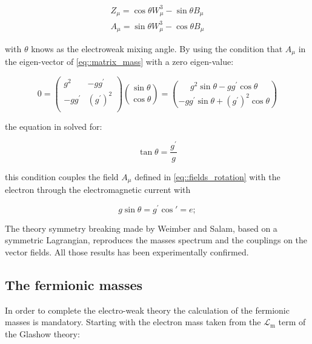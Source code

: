 \begin{equation}
\begin{array}{c}
Z_{\mu} = \cos\theta W^{3}_{\mu} -\sin\theta B_{\mu}\\
A_{\mu} =\sin\theta W^{3}_{\mu} - \cos\theta B_{\mu}

\end{array}
\label{eq::fields_rotation}
\end{equation}

with $\theta$ knows as the electroweak mixing angle. By using the condition that $A_{\mu}$ in the eigen-vector of \autoref{eq::matrix_mass} with a zero eigen-value:

\begin{equation}
0 = 
\begin{pmatrix}
g^{2} & -gg^{\prime} \\
-gg^{\prime} & (g^{\prime})^{2} \\
\end{pmatrix}
\binom{\sin\theta}{\cos\theta}
=
\binom{g^{2}\sin\theta - gg^{\prime}\cos\theta}{-gg^{\prime}\sin\theta + (g^{\prime})^{2}\cos\theta}
\label{eq::matrix_rotation}
\end{equation}

the equation in solved for:

\begin{equation}
\tan\theta = \dfrac{g^{\prime}}{g}
\label{eq::matrix_solution}
\end{equation}

this condition couples the field $A_{\mu}$ defined in \autoref{eq::fields_rotation} with the electron through the electromagnetic current with

\begin{equation}
g\sin\theta = g^{\prime} \cos\prime = e; 
\end{equation}

The theory symmetry breaking made by Weimber and Salam, based on a symmetric Lagrangian, reproduces the masses spectrum and the couplings on the vector fields. All those results has been experimentally confirmed.

\subsection{The fermionic masses}

In order to complete the electro-weak theory the calculation of the fermionic masses is mandatory. Starting with the electron mass taken from the $\mathcal{L}_{\text{m}}$ term of the Glashow theory:

